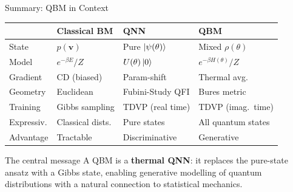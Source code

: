 \documentclass[aspectratio=169,10pt]{beamer}
\begin{document}
\begin{frame}{Summary: QBM in Context}
  \begin{center}
  \small
  \renewcommand{\arraystretch}{1.05}
  \begin{tabular}{p{2.5cm}p{3.0cm}p{3.0cm}p{3.0cm}}
    \toprule
    & \textbf{Classical BM} & \textbf{QNN} & \textbf{QBM} \\
    \midrule
    State      & $p(\mathbf{v})$      & Pure $\ket{\psi(\theta)}$  & Mixed $\rho(\theta)$ \\
    Model      & $e^{-\beta E}/Z$     & $U(\theta)\ket{0}$         & $e^{-\beta H(\theta)}/Z$ \\
    Gradient   & CD (biased)          & Param-shift                & Thermal avg. \\
    Geometry   & Euclidean            & Fubini-Study QFI           & Bures metric \\
    Training   & Gibbs sampling       & TDVP (real time)           & TDVP (imag.\ time) \\
    Expressiv. & Classical dists.     & Pure states                & All quantum states \\
    Advantage  & Tractable            & Discriminative             & Generative \\
    \bottomrule
  \end{tabular}
  \end{center}
  \vspace{0.05cm}
  \begin{alertblock}{The central message}
    \small
    A QBM is a \textbf{thermal QNN}: it replaces the pure-state ansatz
    with a Gibbs state, enabling generative modelling of quantum
    distributions with a natural connection to statistical mechanics.
  \end{alertblock}
\end{frame}
\end{document}
